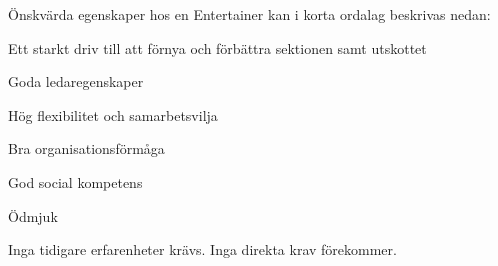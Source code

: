 \documentclass[10pt]{article}
\def\post{Entertainer}
\begin{document}

Önskvärda egenskaper hos en {\post} kan i korta ordalag beskrivas nedan:
\begin{dashlist}
    \item Ett starkt driv till att förnya och förbättra sektionen samt utskottet
    \item Goda ledaregenskaper
    \item Hög flexibilitet och samarbetsvilja
    \item Bra organisationsförmåga
    \item God social kompetens
    \item Ödmjuk
\end{dashlist}

    Inga tidigare erfarenheter krävs. Inga direkta krav förekommer.
\end{document}
